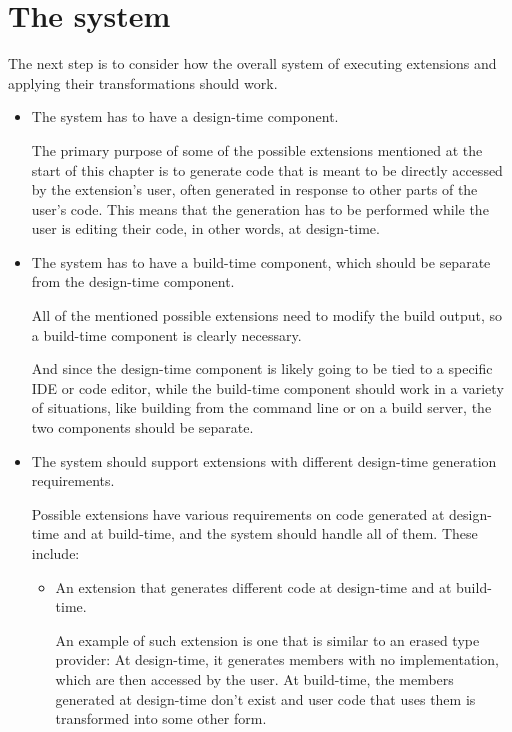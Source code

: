 \section{The system}

The next step is to consider how the overall system of executing extensions and applying their transformations should work.

\begin{itemize}

\item The system has to have a design-time component.

The primary purpose of some of the possible extensions mentioned at the start of this chapter is to generate code that is meant to be directly accessed by the extension's user, often generated in response to other parts of the user's code. This means that the generation has to be performed while the user is editing their code, in other words, at design-time.

\item The system has to have a build-time component, which should be separate from the design-time component.

All of the mentioned possible extensions need to modify the build output, so a build-time component is clearly necessary.

And since the design-time component is likely going to be tied to a specific \ac{IDE} or code editor, while the build-time component should work in a variety of situations, like building from the command line or on a build server, the two components should be separate.

\item The system should support extensions with different design-time generation requirements.

Possible extensions have various requirements on code generated at design-time and at build-time, and the system should handle all of them. These include:

\begin{itemize}
\item An extension that generates different code at design-time and at build-time.

An example of such extension is one that is similar to an erased type provider: At design-time, it generates members with no implementation, which are then accessed by the user. At build-time, the members generated at design-time don't exist and user code that uses them is transformed into some other form.


\end{itemize}
\end{itemize}
